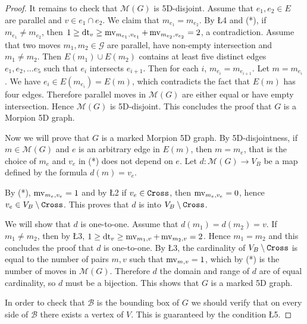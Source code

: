 \begin{proof}
It remains to check that ${\mathcal M}(G)$ is 5D-disjoint. 
  Assume that $e_1, e_2 \in E$ are parallel and $v \in e_1 \cap e_2$. We claim that $m_{e_1} = m_{e_2}$.
  By \L{4} and (*), if $m_{e_1} \neq m_{e_2}$, then $1 \geq \operatorname{dt}_v \geq \operatorname{mv}_{m_{e_1}, v_{e_1}} 
  	+ \operatorname{mv}_{m_{e_2}, v_{e_2}} = 2$, a contradiction. 
Assume that two moves $m_1, m_2 \in \mathcal{G}$ are parallel, have non-empty intersection and $m_1 \neq m_2$. Then 
  $E(m_1) \cup E(m_2)$ contains at least five distinct edges $e_1, e_2, \ldots e_5$ such that $e_{i}$ intersects $e_{i+1}$.
Then for each $i$, $m_{e_i} = m_{e_{i+1}}$. Let $m = m_{e_i}$. We have $e_i \in E(m_{e_i}) = E(m)$, which contradicts
  the fact that $E(m)$ has four edges. Therefore parallel moves in $\mathcal{M}(G)$ are either equal or have empty intersection.
Hence $\mathcal{M}(G)$ is 5D-disjoint. This concludes the proof that $G$ is a Morpion 5D graph.
  

Now we will prove that $G$ is a marked Morpion 5D graph.
  By 5D-disjointness, if $m \in \mathcal{M}(G)$ and $e$ is an arbitrary edge in $E(m)$, then $m = m_e$, that is the choice of $m_e$ and $v_e$ in (*) does not depend on $e$. 
Let $d \colon \mathcal{M}(G) \to V_B$ be a map defined by the formula $d(m) = v_e$. 

By (*), $\operatorname{mv}_{m_e, v_e} = 1$ and by \L{2} if $v_e \in \texttt{Cross}$, then $\operatorname{mv}_{m_e, v_e} = 0$, hence $v_e  \in V_B \setminus \texttt{Cross}$. This proves that $d$ is into $V_B \setminus \texttt{Cross}$.

We will show that $d$ is one-to-one. Assume that $d(m_1) = d(m_2) = v$. If $m_1 \neq m_2$, then by \L{3}, $1 \geq \operatorname{dt}_v \geq \operatorname{mv}_{m_1, v} + \operatorname{mv}_{m_2, v} = 2$. Hence $m_1 = m_2$ and this 
concludes the proof that $d$ is one-to-one. %
By \L{3}, the cardinality of $V_B \setminus \texttt{Cross}$ is equal to the number of pairs $m, v$ such that $\operatorname{mv}_{m,v} = 1$, which by (*) is the number of moves in $\mathcal{M}(G)$.
  Therefore $d$ the domain and range of $d$ are of equal cardinality, so $d$ must be a bijection. This shows that $G$ is a marked 5D graph. 
  
In order to check that $\mathcal{B}$ is the bounding box of $G$ we should verify that on every side of $\mathcal{B}$ there exists
a vertex of $V$. This is guaranteed by the condition \L{5}. %
  

\end{proof}
